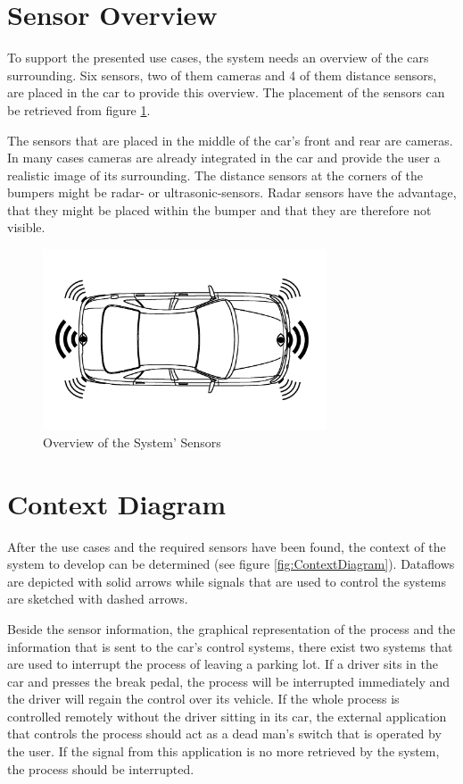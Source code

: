 \section{Sensor Overview}
\label{sect:sensors}
To support the presented use cases, the system needs an overview of the cars
surrounding. Six sensors, two of them cameras and 4 of them distance sensors,
are placed in the car to provide this overview. The placement of the sensors can be
retrieved from figure \ref{fig:SensorOverview}.

The sensors that are placed in the middle of the car's front and rear are
cameras. In many cases cameras are already integrated in the car and provide the
user a realistic image of its surrounding. The distance sensors at the corners
of the bumpers might be radar- or ultrasonic-sensors. Radar sensors have the
advantage, that they might be placed within the bumper and that they are
therefore not visible.

\begin{figure}
\centering
\captionsetup{justification=centering}
\includegraphics[width=0.75\textwidth]{res/systemAnalysis/SensorOverview.png}
\caption{Overview of the System' Sensors}
\label{fig:SensorOverview}
\end{figure}

\section{Context Diagram}

After the use cases and the required sensors have been found, the context of the
system to develop can be determined (see figure \ref{fig:ContextDiagram}).
Dataflows are depicted with solid arrows while signals that are used to control
the systems are sketched with dashed arrows.

Beside the sensor information, the graphical representation of the process and
the information that is sent to the car's control systems, there exist two
systems that are used to interrupt the process of leaving a parking lot. If a
driver sits in the car and presses the break pedal, the process will be
interrupted immediately and the driver will regain the control over its vehicle.
If the whole process is controlled remotely without the driver sitting in its
car, the external application that controls the process should act as a dead
man's switch that is operated by the user. If the signal from this application
is no more retrieved by the system, the process should be interrupted.


